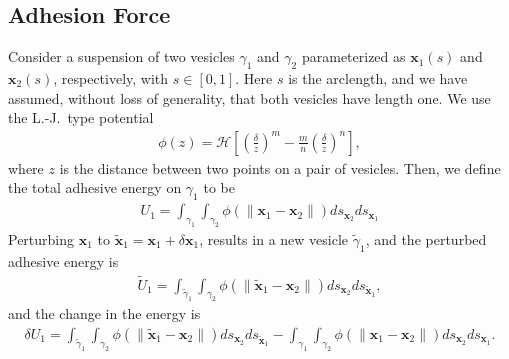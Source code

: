 \documentclass[prf,superscriptaddress,showkeys,longbibliography]{revtex4-1}
\newcommand{\xx}{\mathbf{x}}
\begin{document}
\begin{appendices}
\section{Adhesion Force}
\label{sec:appendixA}
Consider a suspension of two vesicles $\gamma_1$ and $\gamma_2$
parameterized as $\xx_1(s)$ and $\xx_2(s)$, respectively, with $s \in
[0,1]$.  Here $s$ is the arclength, and we have assumed, without loss of
generality, that both vesicles have length one.  We use the  L.-J.~type
potential
\begin{align*}
  \phi(z) = \mathcal{H} \left[ 
    \left(\frac{\delta}{z}\right)^m - \frac{m}{n}\left(\frac{\delta}{z}\right)^n \right],
\end{align*}
where $z$ is the distance between two points on a pair of vesicles.  Then, we define the total
adhesive energy on $\gamma_1$ to be
\begin{align*}
  U_1 = \int_{\gamma_1} \int_{\gamma_2} \phi(\|\xx_1 - \xx_2\|) 
    ds_{\xx_2} ds_{\xx_1}
\end{align*}
Perturbing $\xx_1$ to $\tilde{\xx}_1 = \xx_1 +  \delta \xx_1$, results
in a new vesicle $\tilde{\gamma}_1$, and the perturbed adhesive energy is
\begin{align*}
  \widetilde{U}_1 = \int_{\tilde{\gamma}_1} \int_{\gamma_2}
  \phi(\|\tilde{\xx}_1 - \xx_2\|) ds_{\xx_2} ds_{\tilde{\xx}_1},
\end{align*}
and the change in the energy is
\begin{align*}
  \delta U_1 = \int_{\tilde{\gamma}_1} \int_{\gamma_2}
  \phi(\|\tilde{\xx}_1 - \xx_2\|) ds_{\xx_2} ds_{\tilde{\xx}_1} - 
  \int_{\gamma_1} \int_{\gamma_2} \phi(\|\xx_1 - \xx_2\|) 
  ds_{\xx_2} ds_{\xx_1}.
\end{align*}


\end{appendices}
\end{document}
